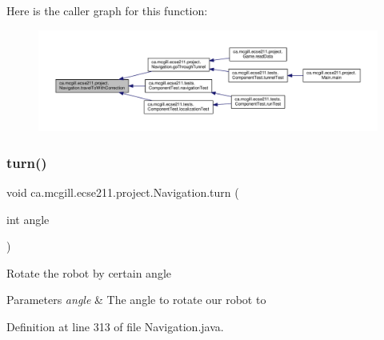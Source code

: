 Here is the caller graph for this function\+:
\nopagebreak
\begin{figure}[H]
\begin{center}
\leavevmode
\includegraphics[width=350pt]{classca_1_1mcgill_1_1ecse211_1_1project_1_1_navigation_ae7230e905494002087416294f12cae6a_icgraph}
\end{center}
\end{figure}
\mbox{\label{classca_1_1mcgill_1_1ecse211_1_1project_1_1_navigation_ad74286ad36d333bfaf57661837457b76}} 
\subsubsection{\texorpdfstring{turn()}{turn()}}
{\footnotesize\ttfamily void ca.\+mcgill.\+ecse211.\+project.\+Navigation.\+turn (\begin{DoxyParamCaption}\item[{int}]{angle }\end{DoxyParamCaption})}

Rotate the robot by certain angle


\begin{DoxyParams}{Parameters}
{\em angle} & The angle to rotate our robot to \\
\hline
\end{DoxyParams}


Definition at line 313 of file Navigation.\+java.


